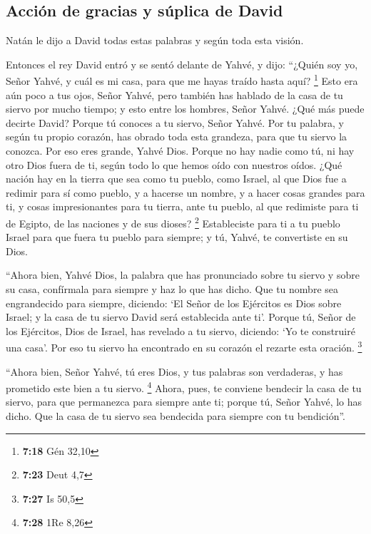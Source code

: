 \begin{paracol}{2}
\hypertarget{acciuxf3n-de-gracias-y-suxfaplica-de-david}{%
\subsection{Acción de gracias y súplica de
David}\label{acciuxf3n-de-gracias-y-suxfaplica-de-david}}

 Natán le dijo a David todas estas palabras y según toda
esta visión.

 Entonces el rey David entró y se sentó delante de Yahvé,
y dijo: ``¿Quién soy yo, Señor Yahvé, y cuál es mi casa, para que me
hayas traído hasta aquí? \footnote{\textbf{7:18} Gén 32,10}
 Esto era aún poco a tus ojos, Señor Yahvé, pero también
has hablado de la casa de tu siervo por mucho tiempo; y esto entre los
hombres, Señor Yahvé.  ¿Qué más puede decirte David?
Porque tú conoces a tu siervo, Señor Yahvé.  Por tu
palabra, y según tu propio corazón, has obrado toda esta grandeza, para
que tu siervo la conozca.  Por eso eres grande, Yahvé
Dios. Porque no hay nadie como tú, ni hay otro Dios fuera de ti, según
todo lo que hemos oído con nuestros oídos.  ¿Qué nación
hay en la tierra que sea como tu pueblo, como Israel, al que Dios fue a
redimir para sí como pueblo, y a hacerse un nombre, y a hacer cosas
grandes para ti, y cosas impresionantes para tu tierra, ante tu pueblo,
al que redimiste para ti de Egipto, de las naciones y de sus dioses?
\footnote{\textbf{7:23} Deut 4,7}  Estableciste para ti a
tu pueblo Israel para que fuera tu pueblo para siempre; y tú, Yahvé, te
convertiste en su Dios.

 ``Ahora bien, Yahvé Dios, la palabra que has pronunciado
sobre tu siervo y sobre su casa, confírmala para siempre y haz lo que
has dicho.  Que tu nombre sea engrandecido para siempre,
diciendo: `El Señor de los Ejércitos es Dios sobre Israel; y la casa de
tu siervo David será establecida ante ti'.  Porque tú,
Señor de los Ejércitos, Dios de Israel, has revelado a tu siervo,
diciendo: `Yo te construiré una casa'. Por eso tu siervo ha encontrado
en su corazón el rezarte esta oración. \footnote{\textbf{7:27} Is 50,5}

 ``Ahora bien, Señor Yahvé, tú eres Dios, y tus palabras
son verdaderas, y has prometido este bien a tu siervo. \footnote{\textbf{7:28}
  1Re 8,26}  Ahora, pues, te conviene bendecir la casa de
tu siervo, para que permanezca para siempre ante ti; porque tú, Señor
Yahvé, lo has dicho. Que la casa de tu siervo sea bendecida para siempre
con tu bendición''.


\end{paracol}
